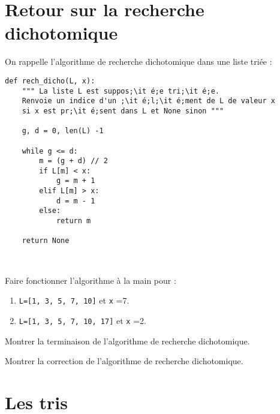\section{Retour sur la recherche dichotomique}


On rappelle l'algorithme de recherche dichotomique dans une liste triée : 


\bigskip

\begin{minipage}{0.9\linewidth}
\begin{lstlisting}[escapeinside =;;]
def rech_dicho(L, x):
    """ La liste L est suppos;\it é;e tri;\it é;e. 
    Renvoie un indice d'un ;\it é;l;\it é;ment de L de valeur x 
    si x est pr;\it é;sent dans L et None sinon """
    
    g, d = 0, len(L) -1 

    while g <= d:
        m = (g + d) // 2
        if L[m] < x:
            g = m + 1
        elif L[m] > x:
            d = m - 1 
        else:
            return m
            
    return None

\end{lstlisting}

\end{minipage}\,
\begin{minipage}{0.05\linewidth}
\fbox{\thecode}\addtocounter{code}{1}
\end{minipage}

\exercice{}

Faire fonctionner l'algorithme à la main pour :
\setlength{\columnseprule}{0pt} 
\begin{multicols}{2}  

\begin{enumerate}[1.]
  \item \verb+L=[1, 3, 5, 7, 10]+ et \verb+x+ =7. 
  \item \verb+L=[1, 3, 5, 7, 10, 17]+ et \verb+x+ =2. 
\end{enumerate}
\end{multicols} 


\exercice{}
Montrer la terminaison de l'algorithme de recherche dichotomique.


\exercice{}
Montrer la correction de l'algorithme de recherche dichotomique.



\section{Les tris}

